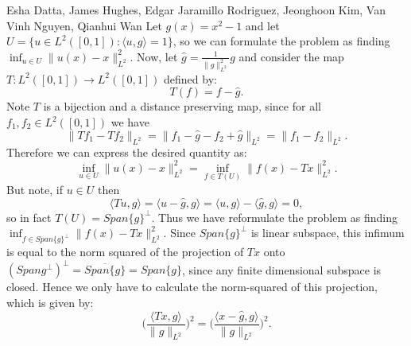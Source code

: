 

\begin{solution}{Esha Datta, James Hughes, Edgar Jaramillo Rodriguez, Jeonghoon Kim, Van Vinh Nguyen, Qianhui Wan}
        Let $g(x)= x^2-1$ and let $U =\{u\in L^2([0,1]) : \langle u ,g \rangle = 1 \}$, so we can formulate the problem as finding $\inf_{u\in U} \lVert u(x)-x \rVert_{L^2}^2$.
        Now, let $\hat{g} = \frac{1}{\lVert g \rVert_{L^2}^2}g$ and consider the map $T: L^2([0,1]) \to L^2([0,1])$ defined by:
        \[ T(f) = f - \hat{g}. \]
        Note $T$ is a bijection and a distance preserving map, since for all $f_1,f_2 \in L^2([0,1])$ we have 
        \[ \lVert Tf_1-Tf_2 \rVert_{L^2} = \lVert f_1- \hat{g} - f_2 + \hat{g} \rVert_{L^2} = \lVert f_1-f_2 \rVert_{L^2}. \]
        Therefore we can express the desired quantity as:
        \[ \inf_{u\in U} \lVert u(x)-x \rVert_{L^2}^2 = \inf_{f\in T(U)} \lVert f(x)-Tx \rVert_{L^2}^2. \]
        But note, if $u\in U$ then
        \[ \langle Tu, g\rangle = \langle u - \hat{g}, g\rangle = \langle u , g\rangle - \langle \hat{g},g \rangle = 0, \]
        so in fact $T(U) = Span\{g\}^\perp$.
        Thus we have reformulate the problem as finding $\inf_{f\in Span\{g\}^\perp} \lVert f(x)-Tx \rVert_{L^2}^2$.
        Since $Span\{g\}^\perp$ is linear subspace, this infimum is equal to the norm squared of the projection of $Tx$ onto $(Span{g}^\perp)^\perp = \overline{Span\{g\}} = Span\{g\}$, since any finite dimensional subspace is closed.
        Hence we only have to calculate the norm-squared of this projection, which is given by:
        \[ \bigg(\frac{\langle Tx,g\rangle}{\lVert g \rVert_{L^2}} \bigg)^2 =  \bigg(\frac{\langle x-\hat{g}, g\rangle}{\lVert g \rVert_{L^2}}\bigg)^2. \]
\end{solution}

